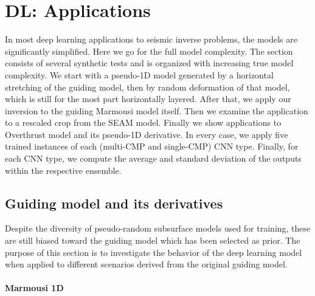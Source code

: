 \documentclass[paper,twocolomn]{geophysics}
\begin{document}
\section{DL: Applications}
In most deep learning applications to seismic inverse problems, the models are significantly simplified. Here we go for the full model complexity. The section consists of several synthetic tests and is organized with increasing true model complexity. We start with a pseudo-1D model generated by a horizontal stretching of the guiding model, then by random deformation of that model, which is still for the most part horizontally layered. After that, we apply our inversion to the guiding Marmousi model itself. Then we examine the application to a rescaled crop from the SEAM model. Finally we show applications to Overthrust model and its pseudo-1D derivative. In every case, we apply five trained instances of each (multi-CMP and single-CMP) CNN type. Finally, for each CNN type, we compute the average and standard deviation of the outputs within the respective ensemble.


\subsection{Guiding model and its derivatives}

Despite the diversity of pseudo-random subsurface models used for training, these are still biased toward the guiding model which has been selected as prior. The purpose of this section is to investigate the behavior of the deep learning model when applied to different scenarios derived from the original guiding model.

\paragraph{Marmousi 1D}
\newcommand{\modelFname}{marmvel1D}
\end{document}
